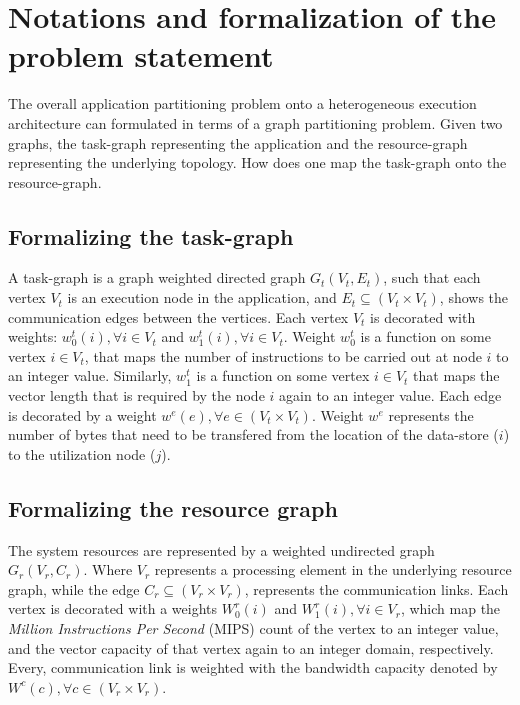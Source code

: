 \section{Notations and formalization of the problem statement}
\label{sec:relat-notat-form}

The overall application partitioning problem onto a heterogeneous
execution architecture can formulated in terms of a graph partitioning
problem. Given two graphs, the task-graph representing the application
and the resource-graph representing the underlying topology. How does
one map the task-graph onto the resource-graph.


\subsection{Formalizing the task-graph}
\label{sec:form-task-graph}

A task-graph is a graph weighted directed graph $G_t(V_t,E_t)$, such
that each vertex $V_t$ is an execution node in the application, and
\mbox{$E_t \subseteq (V_t \times V_t)$}, shows the communication edges
between the vertices. Each vertex $V_t$ is decorated with weights:
$w^t_0(i), \forall i \in V_t$ and $w^t_1(i), \forall i \in V_t$. Weight
$w^t_0$ is a function on some vertex $i \in V_t$, that maps the number
of instructions to be carried out at node $i$ to an integer
value. Similarly, $w^t_1$ is a function on some vertex $i \in V_t$ that
maps the vector length that is required by the node $i$ again to an
integer value. Each edge is decorated by a weight $w^e(e), \forall e \in
(V_t \times V_t)$. Weight $w^e$ represents the number of bytes that need
to be transfered from the location of the data-store ($i$) to the
utilization node ($j$).


\subsection{Formalizing the resource graph}
\label{sec:form-reso-graph}

The system resources are represented by a weighted undirected graph
$G_r(V_r,C_r)$. Where $V_r$ represents a processing element in the
underlying resource graph, while the edge $C_r \subseteq (V_r \times
V_r)$, represents the communication links. Each vertex is decorated with
a weights $W^r_0(i)$ and $W^r_1(i), \forall i \in V_r$, which map the
\textit{Million Instructions Per Second} (MIPS) count of the vertex to
an integer value, and the vector capacity of that vertex again to an
integer domain, respectively. Every, communication link is weighted with
the bandwidth capacity denoted by $W^c(c), \forall c \in (V_r \times
V_r)$.

